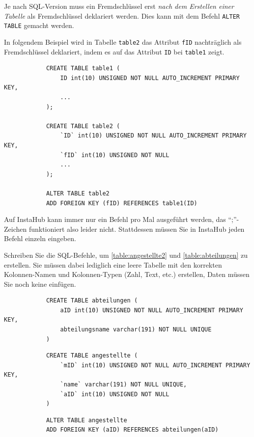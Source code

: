 \begin{mycaution}
	Je nach SQL-Version muss ein Fremdschlüssel erst \textit{nach dem Erstellen einer Tabelle} als Fremdschlüssel deklariert werden. Dies kann mit dem Befehl \lstinline|ALTER TABLE| gemacht werden. 
	\begin{myexample}
		In folgendem Beispiel wird in Tabelle \lstinline|table2| das Attribut \lstinline|fID| nachträglich als Fremdschlüssel deklariert, indem es auf das Attribut \lstinline|ID| bei \lstinline|table1| zeigt.
		\begin{lstlisting}
			CREATE TABLE table1 (
				ID int(10) UNSIGNED NOT NULL AUTO_INCREMENT PRIMARY KEY,
				...
			);
			
			CREATE TABLE table2 (
				`ID` int(10) UNSIGNED NOT NULL AUTO_INCREMENT PRIMARY KEY,
				`fID` int(10) UNSIGNED NOT NULL
				...
			);
			
			ALTER TABLE table2
			ADD FOREIGN KEY (fID) REFERENCES table1(ID)
		\end{lstlisting}
	\end{myexample}
\end{mycaution}

	\begin{mycaution}
Auf InstaHub kann immer nur ein Befehl pro Mal ausgeführt werden, das ``;''-Zeichen funktioniert also leider nicht. Stattdessen müssen Sie in InstaHub jeden Befehl einzeln eingeben.
	\end{mycaution}

\begin{myexercise}
	Schreiben Sie die SQL-Befehle, um \cref{table:angestellte2} und \cref{table:abteilungen} zu erstellen. Sie müssen dabei lediglich eine leere Tabelle mit den korrekten Kolonnen-Namen und Kolonnen-Typen (Zahl, Text, etc.) erstellen, Daten müssen Sie noch keine einfügen.
	\begin{myanswer}
		\begin{lstlisting}
			CREATE TABLE abteilungen (
				aID int(10) UNSIGNED NOT NULL AUTO_INCREMENT PRIMARY KEY,
				abteilungsname varchar(191) NOT NULL UNIQUE
			)
			\end{lstlisting}
			\begin{lstlisting}
			CREATE TABLE angestellte (
				`mID` int(10) UNSIGNED NOT NULL AUTO_INCREMENT PRIMARY KEY,
				`name` varchar(191) NOT NULL UNIQUE,
				`aID` int(10) UNSIGNED NOT NULL
			)
			\end{lstlisting}
		\begin{lstlisting}
			ALTER TABLE angestellte
			ADD FOREIGN KEY (aID) REFERENCES abteilungen(aID)
		\end{lstlisting}
	\end{myanswer}
\end{myexercise}

